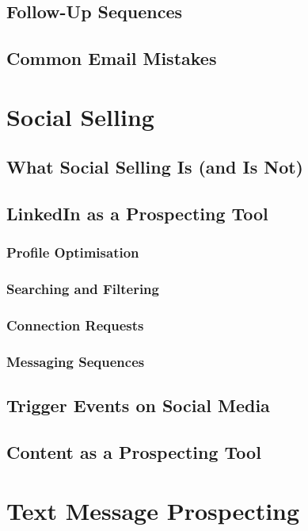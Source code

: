     \subsection{Follow-Up Sequences}\mbox{}
    \subsection{Common Email Mistakes}\mbox{}

\section{Social Selling}\mbox{}
    \subsection{What Social Selling Is (and Is Not)}\mbox{}
    \subsection{LinkedIn as a Prospecting Tool}\mbox{}
        \subsubsection{Profile Optimisation}\mbox{}
        \subsubsection{Searching and Filtering}\mbox{}
        \subsubsection{Connection Requests}\mbox{}
        \subsubsection{Messaging Sequences}\mbox{}
    \subsection{Trigger Events on Social Media}\mbox{}
    \subsection{Content as a Prospecting Tool}\mbox{}

\section{Text Message Prospecting}\mbox{}
